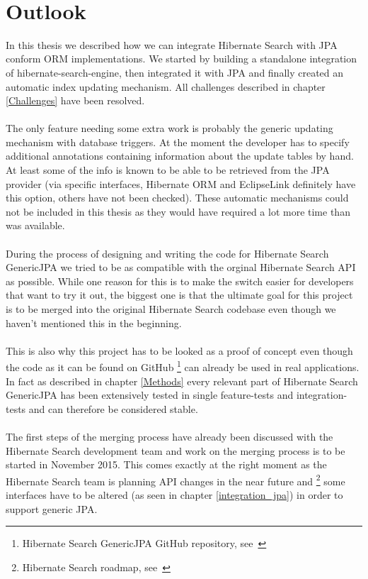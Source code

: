 
~
\pagebreak

\section{Outlook}\label{outlook}

In this thesis we described how we can integrate Hibernate Search with JPA conform ORM implementations. We started by building a standalone integration of hibernate-search-engine, then integrated it with JPA and finally created an automatic index updating mechanism. All challenges described in chapter \ref{Challenges} have been resolved.
\\\\
The only feature needing some extra work is probably the generic updating mechanism with database triggers. At the moment the developer has to specify additional annotations containing information about the update tables by hand. At least some of the info is known to be able to be retrieved from the JPA provider (via specific interfaces, Hibernate ORM and EclipseLink definitely have this option, others have not been checked). These automatic mechanisms could not be included in this thesis as they would have required a lot more time than was available.
\\\\
During the process of designing and writing the code for Hibernate Search GenericJPA we tried to be as compatible with the orginal Hibernate Search API as possible. While one reason for this is to make the switch easier for developers that want to try it out, the biggest one is that the ultimate goal for this project is to be merged into the original Hibernate Search codebase even though we haven't mentioned this in the beginning.
\\\\
This is also why this project has to be looked as a proof of concept even though the code as it can be found on GitHub \footnote{Hibernate Search GenericJPA GitHub repository, see~\cite{hibernate_genericjpa_github}} can already be used in real applications. In fact as described in chapter \ref{Methods} every relevant part of Hibernate Search GenericJPA has been extensively tested in single feature-tests and integration-tests and can therefore be considered stable. 
\\\\
The first steps of the merging process have already been discussed with the Hibernate Search development team and work on the merging process is to be started in November 2015. This comes exactly at the right moment as the Hibernate Search team is planning API changes in the near future and \footnote{Hibernate Search roadmap, see~\cite{hibernate_search_roadmap}} some interfaces have to be altered (as seen in chapter \ref{integration_jpa}) in order to support generic JPA.
